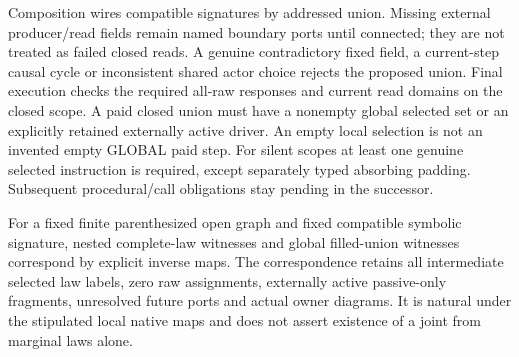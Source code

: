 \documentclass[11pt]{article}\usepackage{amsmath,amssymb,amsthm}
\begin{document}
Composition wires compatible signatures by addressed union. Missing external producer/read fields remain named boundary ports until connected; they are not treated as failed closed reads. A genuine contradictory fixed field, a current-step causal cycle or inconsistent shared actor choice rejects the proposed union. Final execution checks the required all-raw responses and current read domains on the closed scope. A paid closed union must have a nonempty global selected set or an explicitly retained externally active driver. An empty local selection is not an invented empty GLOBAL paid step. For silent scopes at least one genuine selected instruction is required, except separately typed absorbing padding. Subsequent procedural/call obligations stay pending in the successor.

\begin{proposition}
For a fixed finite parenthesized open graph and fixed compatible symbolic signature, nested complete-law witnesses and global filled-union witnesses correspond by explicit inverse maps. The correspondence retains all intermediate selected law labels, zero raw assignments, externally active passive-only fragments, unresolved future ports and actual owner diagrams. It is natural under the stipulated local native maps and does not assert existence of a joint from marginal laws alone.
\end{proposition}
\end{document}
